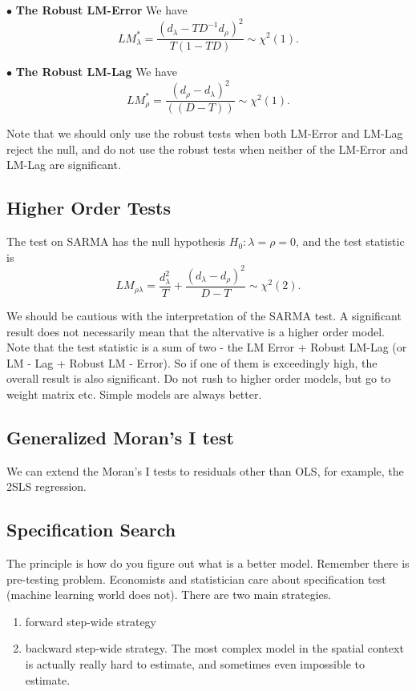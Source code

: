 \documentclass[11pt,a4paper]{amsart}
\theoremstyle{plain}
\theoremstyle{definition}
\begin{document}
$\bullet$ \textbf{The Robust LM-Error} 
We have
\[	LM_{\lambda}^{*} = \frac{(d_{\lambda} - TD^{-1}d_{\rho})^{2}}{T(1-TD)} \sim \chi^{2}(1).	\]


$\bullet$ \textbf{The Robust LM-Lag}
We have 
\[	LM_{\rho}^{*} = \frac{(d_{\rho} - d_{\lambda})^{2}}{((D-T))} \sim \chi^{2}(1).	\]

Note that we should only use the robust tests when both LM-Error and LM-Lag reject the null, and do not use the robust tests when neither of the LM-Error and LM-Lag are significant. 

\subsection{Higher Order Tests}\hfill\par 
The test on SARMA has the null hypothesis $H_{0}: \lambda = \rho = 0$, and the test statistic is 
\[	LM_{\rho \lambda} = \frac{d_{\lambda}^{2}}{T} + \frac{(d_{\lambda} - d_{\rho})^{2}}{D-T} \sim \chi^{2}(2).	\]

We should be cautious with the interpretation of the SARMA test. A significant result does not necessarily mean that the altervative is a higher order model. Note that the test statistic is a sum of two - the LM Error + Robust LM-Lag (or LM - Lag +  Robust LM - Error). So if one of them is exceedingly high, the overall result is also significant. Do not rush to higher order models, but go to weight matrix etc. Simple models are always better.

\subsection{Generalized Moran's I test}

We can extend the Moran's I tests to residuals other than OLS, for example, the 2SLS regression.

\subsection{Specification Search}

The principle is how do you figure out what is a better model. Remember there is pre-testing problem. Economists and statistician care about specification test (machine learning world does not). There are two main strategies.
\begin{enumerate}
	\item forward step-wide strategy
	\item  backward step-wide strategy. The most complex model in the spatial context is actually really hard to estimate, and sometimes even impossible to estimate. 
\end{enumerate}
\end{document}
